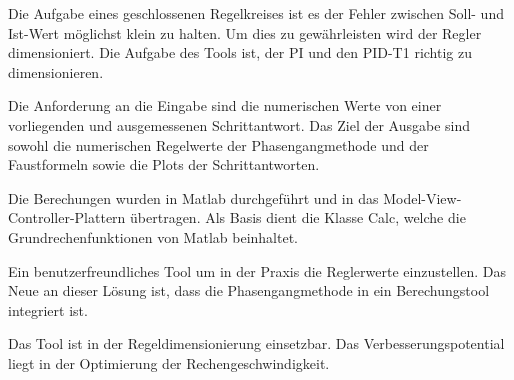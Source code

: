 Die Aufgabe eines geschlossenen Regelkreises  ist es der Fehler zwischen Soll-
und Ist-Wert m\"oglichst klein zu  halten. Um dies zu gew\"ahrleisten wird der
Regler dimensioniert. Die Aufgabe des Tools ist, der PI und den PID-T1 richtig
zu dimensionieren.

Die  Anforderung  an  die  Eingabe   sind  die  numerischen  Werte  von  einer
vorliegenden  und  ausgemessenen  Schrittantwort. Das Ziel  der  Ausgabe  sind
sowohl die  numerischen Regelwerte der Phasengangmethode  und der Faustformeln
sowie die Plots der Schrittantworten.

Die    Berechungen   wurden    in   Matlab    durchgef\"uhrt   und    in   das
Model-View-Controller-Plattern \"ubertragen. Als Basis  dient die Klasse Calc,
welche die Grundrechenfunktionen von Matlab beinhaltet.

Ein   benutzerfreundliches   Tool   um   in   der   Praxis   die   Reglerwerte
einzustellen. Das Neue an  dieser L\"osung ist, dass  die Phasengangmethode in
ein Berechungstool integriert ist.

Das     Tool    ist     in     der    Regeldimensionierung     einsetzbar. Das
Verbesserungspotential liegt in der Optimierung der Rechengeschwindigkeit.
